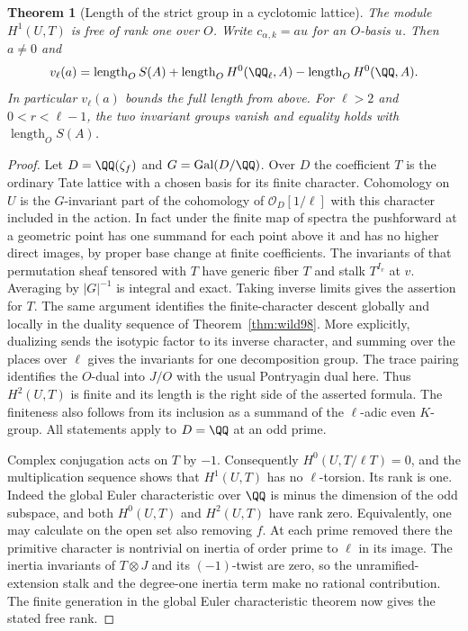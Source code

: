 \documentclass[a4paper,11pt]{article}
\newtheorem{theorem}[proposition]{Theorem}
\theoremstyle{definition}
\theoremstyle{remark}
\numberwithin{equation}{section}
\begin{document}
\begin{theorem}[Length of the strict group in a cyclotomic lattice]\leavevmode
\label{thm:circindex267}
The module \(H^1(U,T)\) is free of rank one over \(O\). Write
\(c_{\alpha,k}=a u\) for an \(O\)-basis \(u\). Then \(a\ne0\)
and
\[
 v_\ell(a)=\operatorname{length}_O S(A)
       +\operatorname{length}_O H^0(\QQ_\ell,A)
       -\operatorname{length}_O H^0(\QQ,A).
\]
In particular \(v_\ell(a)\) bounds the full length from above.
For \(\ell>2\) and \(0<r<\ell-1\), the two invariant groups
vanish and equality holds with \(\operatorname{length}_O S(A)\).
\end{theorem}
\begin{proof}
Let \(D=\QQ(\zeta_f)\) and \(G=\operatorname{Gal}(D/\QQ)\).
Over \(D\) the coefficient \(T\) is the ordinary Tate lattice
with a chosen basis for its finite character. Cohomology on
\(U\) is the \(G\)-invariant part of the cohomology of
\(\mathcal O_D[1/\ell]\) with this character included in the
action. In fact under the finite map of spectra the pushforward
at a geometric point has one summand for each point above it
and has no higher direct images, by proper base change at
finite coefficients. The invariants of that permutation
sheaf tensored with \(T\) have generic fiber \(T\) and stalk
\(T^{I_v}\) at \(v\). Averaging by \(|G|^{-1}\) is integral
and exact. Taking inverse limits gives the assertion for \(T\).
The same argument identifies the finite-character descent
globally and locally in the duality sequence of
Theorem~\ref{thm:wild98}. More explicitly, dualizing sends
the isotypic factor to its inverse character, and summing over
the places over \(\ell\) gives the invariants for one
decomposition group. The trace pairing identifies the
\(O\)-dual into \(J/O\) with the usual Pontryagin dual here.
Thus \(H^2(U,T)\) is finite and its length is the right side
of the asserted formula. The finiteness also follows from
its inclusion as a summand of the \(\ell\)-adic even \(K\)-group.
All statements apply to \(D=\QQ\) at an odd prime.

Complex conjugation acts on \(T\) by \(-1\).
Consequently \(H^0(U,T/\ell T)=0\), and the multiplication
sequence shows that \(H^1(U,T)\) has no \(\ell\)-torsion.
Its rank is one. Indeed the global Euler characteristic over
\(\QQ\) is minus the dimension of the odd subspace, and both
\(H^0(U,T)\) and \(H^2(U,T)\) have rank zero. Equivalently,
one may calculate on the open set also removing \(f\).
At each prime removed there the primitive character is
nontrivial on inertia of order prime to \(\ell\) in its image.
The inertia invariants of \(T\otimes J\) and its \((-1)\)-twist
are zero, so the unramified-extension stalk and the degree-one
inertia term make no rational contribution. The finite generation
in the global Euler characteristic theorem now gives the stated
free rank.


\end{proof}
\end{document}
